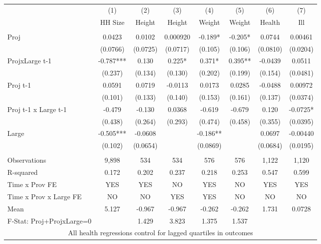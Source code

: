 \begin{tabular}{lccccccc} \hline
 & (1) & (2) & (3) & (4) & (5) & (6) & (7) \\
 & HH Size & Height  & Height   & Weight  & Weight  & Health  & Ill  \\ \hline
 &  &    &  &  & & & \\
Proj & 0.0423  & 0.0102 & 0.000920 & -0.189* & -0.205* & 0.0744 & 0.00461  \\
  & (0.0766) & (0.0725) & (0.0717)  & (0.105) & (0.106) & (0.0810) & (0.0204) \\
ProjxLarge t-1  & -0.787*** & 0.130 & 0.225*  & 0.371* & 0.395** & -0.0439 & 0.0511 \\
 & (0.237) & (0.134) & (0.130)  & (0.202) & (0.199) & (0.154) & (0.0481) \\
Proj t-1  & 0.0591 & 0.0719 & -0.0113 & 0.0173 & 0.0285  & -0.0488 & 0.00972 \\
 & (0.101)  & (0.133) & (0.140)  & (0.153) & (0.161)  & (0.137) & (0.0374) \\
Proj t-1 x Large t-1  & -0.479 & -0.130 & 0.0368  & -0.619 & -0.679  & 0.120 & -0.0725* \\
 & (0.438) & (0.264) & (0.293)  & (0.474) & (0.458)  & (0.355) & (0.0395) \\
Large & -0.505***  & -0.0608 &   & -0.186** &  &  0.0697 & -0.00440   \\
 & (0.102)   & (0.0654) &  &  (0.0869) &  & (0.0684) & (0.0195)  \\
 &  &    &  & & &   \\
Observations & 9,898 & 534 & 534 & 576 & 576  & 1,122 & 1,120\\
R-squared & 0.172 & 0.202 & 0.237 & 0.218 & 0.253 & 0.547 & 0.599 \\
Time x Prov FE   & YES & YES & NO & YES & NO & YES & YES \\
Time x Prov x Large FE & NO  & NO & YES & YES & NO & NO & NO \\
Mean & 5.127 & -0.967 & -0.967  & -0.262 & -0.262  & 1.731 & 0.0728  \\
 F-Stat: Proj+ProjxLarge=0 & & 1.429 & 3.823  & 1.375 & 1.537 & &  \\ \hline
\multicolumn{8}{c}{ All health regressions control for lagged quartiles in outcomes} \\ 
\end{tabular}
